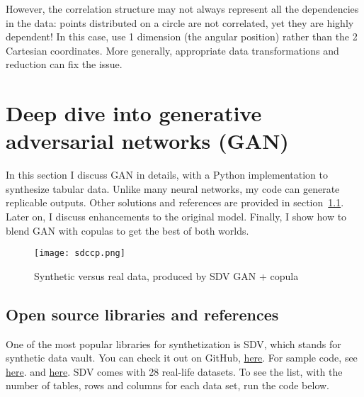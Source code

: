\documentclass[oneside,10pt]{book}
\begin{document}
However, the correlation structure may not always represent all the dependencies in the data: points distributed on a circle are not correlated, yet they are highly dependent! In this case, use 1 dimension (the angular position)  rather than 
 the 2 Cartesian coordinates. More generally, appropriate data transformations and reduction can fix the issue.


\section{Deep dive into generative adversarial networks (GAN)}

In this section I discuss GAN in details, with a Python implementation to synthesize tabular data. Unlike many neural networks, my code can generate replicable outputs. 
Other solutions and references are provided in section~\ref{xcvcx}. Later on, I discuss enhancements to the original model. Finally, I show how to blend GAN with copulas to get the best
 of both worlds. 


\begin{figure}[H]
\centering
\texttt{[image: sdccp.png]}  
\caption{Synthetic versus real data, produced by SDV GAN + copula}
\label{fig:pictty}
\end{figure}

\subsection{Open source libraries and references}\label{xcvcx}

One of the most popular libraries for synthetization is SDV, which stands for 
\textcolor{index}{synthetic data vault}. You can check it out on GitHub, 
 \href{https://github.com/sdv-dev/SDV}{here}. For sample code,
 see \href{https://medium.com/@davide.gazze/sdv-generate-synthetic-data-using-gan-and-python-4c26a1e4b3c2}{here}. 
and \href{https://bobrupakroy.medium.com/gan-based-deep-learning-data-synthesizer-copulagan-a6376169b3ca}{here}. 
SDV comes with 28 real-life datasets. To see the list, with the number of tables, rows and columns for each data set, run the code below. \vspace{1ex}
\end{document}
